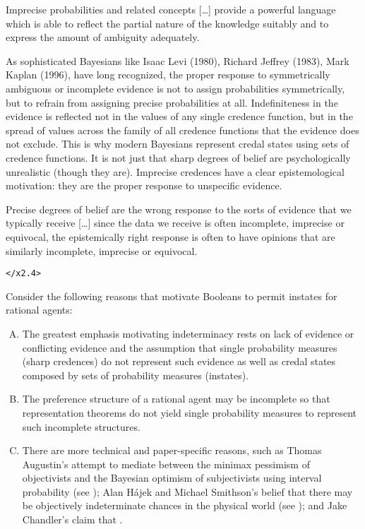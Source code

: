 \documentclass[11pt]{article}
\begin{document}
\begin{quotex}
  Imprecise probabilities and related concepts [{\ldots}] provide a powerful language which is able to reflect the partial nature of the knowledge suitably and to express the amount of ambiguity adequately. 
\end{quotex}

\begin{quotex}
  As sophisticated Bayesians like Isaac Levi (1980), Richard Jeffrey (1983), Mark Kaplan (1996), have long recognized, the proper response to symmetrically ambiguous or incomplete evidence is not to assign probabilities symmetrically, but to refrain from assigning precise probabilities at all. Indefiniteness in the evidence is reflected not in the values of any single credence function, but in the spread of values across the family of all credence functions that the evidence does not exclude. This is why modern Bayesians represent credal states using sets of credence functions. It is not just that sharp degrees of belief are psychologically unrealistic (though they are). Imprecise credences have a clear epistemological motivation: they are the proper response to unspecific evidence. 
\end{quotex}

\begin{quotex}
  Precise degrees of belief are the wrong response to the sorts of evidence that we typically receive [{\ldots}] since the data we receive is often incomplete, imprecise or equivocal, the epistemically right response is often to have opinions that are similarly incomplete, imprecise or equivocal. 
\end{quotex}\texttt{</x2.4>}

Consider the following reasons that motivate Booleans to permit instates for rational agents:

\begin{enumerate}[(A)]
\item The greatest emphasis motivating indeterminacy rests on lack of evidence or conflicting evidence and the assumption that single probability measures (sharp credences) do not represent such evidence as well as credal states composed by sets of probability measures (instates).
\item The preference structure of a rational agent may be incomplete so that representation theorems do not yield single probability measures to represent such incomplete structures.
\item There are more technical and paper-specific reasons, such as Thomas Augustin's attempt to mediate between the minimax pessimism of objectivists and the Bayesian optimism of subjectivists using interval probability (see ); Alan H{\'a}jek and Michael Smithson's belief that there may be objectively indeterminate chances in the physical world (see ); and Jake Chandler's claim that  .
\end{enumerate}
\end{document}
